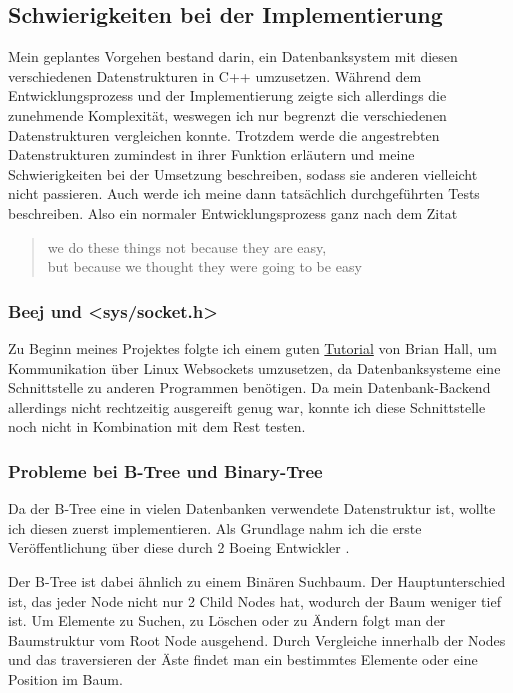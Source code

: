 \documentclass[11pt,a4paper]{article}
\begin{document}
\subsection{Schwierigkeiten bei der Implementierung}

Mein geplantes Vorgehen bestand darin, ein Datenbanksystem mit diesen
verschiedenen Datenstrukturen in C++ umzusetzen.
Während dem Entwicklungsprozess und der Implementierung zeigte sich allerdings die
zunehmende Komplexität, weswegen ich nur begrenzt die verschiedenen Datenstrukturen
vergleichen konnte. Trotzdem werde die angestrebten Datenstrukturen
zumindest in ihrer Funktion erläutern und meine Schwierigkeiten bei der Umsetzung
beschreiben, sodass sie anderen vielleicht nicht passieren.
Auch werde ich meine dann tatsächlich durchgeführten Tests beschreiben.
Also ein normaler Entwicklungsprozess ganz nach dem Zitat

\begin{quote}
    \guillemetright we do these things not because they are easy, \\
    but because we thought they were going to be easy \guillemetleft
\end{quote}

\subsubsection{Beej und <sys/socket.h>}
Zu Beginn meines Projektes folgte ich einem guten \href{https://beej.us/guide/bgnet/html/}{Tutorial}
von Brian Hall, um Kommunikation über Linux Websockets umzusetzen, da Datenbanksysteme
eine Schnittstelle zu anderen Programmen benötigen.
Da mein Datenbank-Backend allerdings nicht rechtzeitig ausgereift genug war, konnte
ich diese Schnittstelle noch nicht in Kombination mit dem Rest testen.

\subsubsection{Probleme bei B-Tree und Binary-Tree}

Da der B-Tree eine in vielen Datenbanken verwendete Datenstruktur ist, wollte ich
diesen zuerst implementieren. Als Grundlage nahm ich die erste Veröffentlichung über
diese durch 2 Boeing Entwickler \cite{boeing_engineers}.

\vspace*{0.3cm}

Der B-Tree ist dabei ähnlich zu einem Binären Suchbaum.
Der Hauptunterschied ist, das jeder Node nicht nur 2 Child Nodes
hat, wodurch der Baum weniger tief ist.
Um Elemente zu Suchen, zu Löschen oder zu Ändern folgt man der Baumstruktur vom
Root Node ausgehend. Durch Vergleiche innerhalb der Nodes und das traversieren der
Äste findet man ein bestimmtes Elemente oder eine Position im Baum.
\end{document}
